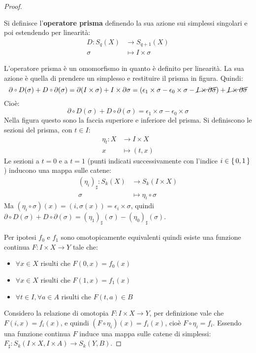 \begin{proof}
  \begin{definition}
    Si definisce l'\textbf{operatore prisma} definendo
    la sua azione sui simplessi singolari e poi estendendo per linearità:
    \begin{align*}
      D \colon S_q(X) & \to S_{q+1}(X) \\
      \sigma & \mapsto I \times \sigma
    \end{align*}
  \end{definition}
  L'operatore prisma è un omomorfismo in quanto è definito per linearità. La sua
  azione è quella di prendere un simplesso e restituire il prisma in figura.
  Quindi:
  \[
    \partial \circ D (\sigma) + D \circ \partial (\sigma) = \partial (I \times \sigma) + I \times \partial \sigma = (\epsilon_1 \times \sigma - \epsilon_0 \times \sigma - \cancel{I \times \partial \sigma})
    + \cancel{I \times \partial \sigma}
  \]
  Cioè:
  \[
    \partial \circ D (\sigma) + D \circ \partial (\sigma) = \epsilon_1 \times \sigma - \epsilon_0 \times \sigma
  \]
  Nella figura questo sono la faccia superiore e inferiore del prisma.
  Si definiscono le sezioni del prisma, con $ t \in I $:
  \begin{align*}
    \eta_t  \colon X & \to I \times X \\
    x & \mapsto (t,x)
  \end{align*}
  Le sezioni a $ t = 0 $ e a $ t = 1 $ (punti indicati successivamente con
  l'indice $ i \in \set{0,1} $) inducono una mappa sulle catene:
  \begin{align*}
    (\eta_i)_\sharp \colon S_k(X) & \to S_k(I \times X) \\
    \sigma & \mapsto \eta_i \circ \sigma
  \end{align*}
  Ma $ (\eta_i \circ \sigma)(x) = (i, \sigma(x)) = \epsilon_i \times \sigma $, quindi
  $ \partial \circ D (\sigma) + D \circ \partial (\sigma) = (\eta_1)_\sharp(\sigma) - (\eta_0)_\sharp(\sigma) $.

  Per ipotesi $ f_0 $ e $ f_1 $ sono omotopicamente equivalenti quindi esiste
  una funzione continua $ F \colon I \times X \to Y $ tale che:
  \begin{itemize}
  \item $ \forall x \in X $ risulti che $ F(0,x) = f_0(x) $
  \item $ \forall x \in X $ risulti che $ F(1,x) = f_1(x) $
  \item $ \forall t \in I, \forall a \in A $ risulti che  $ F(t,a) \in B $
  \end{itemize}
  Considero la relazione di omotopia $ F \colon I \times X \to Y $, per definizione vale che
  $ F(i,x) = f_i(x) $, e quindi $ (F \circ \eta_i)(x) = f_i(x) $, cioè
  $ F \circ \eta_i = f_i $. Essendo una funzione continua $ F $ induce una mappa sulle
  catene di simplessi: $ F_\sharp \colon S_k(I \times X, I \times A) \to S_k(Y,B) $.


\end{proof}
